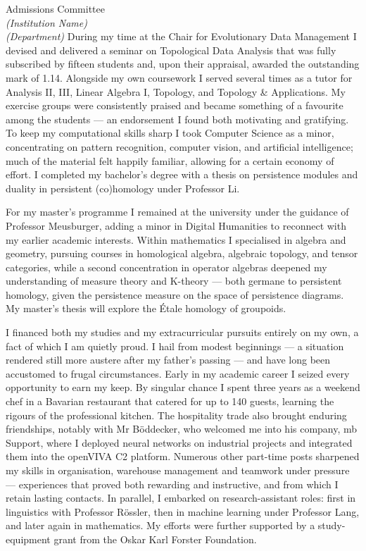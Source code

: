 \documentclass[11pt]{letter}
\begin{document}
\begin{letter}{%
Admissions Committee\\[2pt]%
\textit{(Institution Name)}\\%
\textit{(Department)}}
During my time at the Chair for Evolutionary Data Management I devised and delivered a seminar on Topological Data Analysis that was fully subscribed by fifteen students and, upon their appraisal, awarded the outstanding mark of 1.14. Alongside my own coursework I served several times as a tutor for Analysis II, III, Linear Algebra I, Topology, and Topology & Applications. My exercise groups were consistently praised and became something of a favourite among the students — an endorsement I found both motivating and gratifying. To keep my computational skills sharp I took Computer Science as a minor, concentrating on pattern recognition, computer vision, and artificial intelligence; much of the material felt happily familiar, allowing for a certain economy of effort. I completed my bachelor’s degree with a thesis on persistence modules and duality in persistent (co)homology under Professor Li.

For my master’s programme I remained at the university under the guidance of Professor Meusburger, adding a minor in Digital Humanities to reconnect with my earlier academic interests. Within mathematics I specialised in algebra and geometry, pursuing courses in homological algebra, algebraic topology, and tensor categories, while a second concentration in operator algebras deepened my understanding of measure theory and K-theory — both germane to persistent homology, given the persistence measure on the space of persistence diagrams. My master’s thesis will explore the Étale homology of groupoids.

I financed both my studies and my extracurricular pursuits entirely on my own, a fact of which I am quietly proud. I hail from modest beginnings — a situation rendered still more austere after my father’s passing — and have long been accustomed to frugal circumstances. Early in my academic career I seized every opportunity to earn my keep. By singular chance I spent three years as a weekend chef in a Bavarian restaurant that catered for up to 140 guests, learning the rigours of the professional kitchen. The hospitality trade also brought enduring friendships, notably with Mr Böddecker, who welcomed me into his company, mb Support, where I deployed neural networks on industrial projects and integrated them into the openVIVA C2 platform. Numerous other part-time posts sharpened my skills in organisation, warehouse management and teamwork under pressure — experiences that proved both rewarding and instructive, and from which I retain lasting contacts. In parallel, I embarked on research-assistant roles: first in linguistics with Professor Rössler, then in machine learning under Professor Lang, and later again in mathematics. My efforts were further supported by a study-equipment grant from the Oskar Karl Forster Foundation.


\end{letter}
\end{document}
